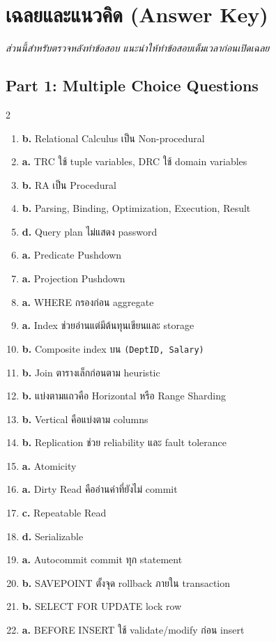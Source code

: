 \documentclass[a4paper,12pt]{article}
\newcommand{\ans}[1]{\textbf{#1}}
\begin{document}
\section*{เฉลยและแนวคิด (Answer Key)}
\textit{ส่วนนี้สำหรับตรวจหลังทำข้อสอบ แนะนำให้ทำข้อสอบเต็มเวลาก่อนเปิดเฉลย}

\subsection*{Part 1: Multiple Choice Questions}
\begin{multicols}{2}
\begin{enumerate}[label=\textbf{\arabic*.}]
    \item \ans{b.} Relational Calculus เป็น Non-procedural
    \item \ans{a.} TRC ใช้ tuple variables, DRC ใช้ domain variables
    \item \ans{b.} RA เป็น Procedural
    \item \ans{b.} Parsing, Binding, Optimization, Execution, Result
    \item \ans{d.} Query plan ไม่แสดง password
    \item \ans{a.} Predicate Pushdown
    \item \ans{a.} Projection Pushdown
    \item \ans{a.} WHERE กรองก่อน aggregate
    \item \ans{a.} Index ช่วยอ่านแต่มีต้นทุนเขียนและ storage
    \item \ans{b.} Composite index บน \texttt{(DeptID, Salary)}
    \item \ans{b.} Join ตารางเล็กก่อนตาม heuristic
    \item \ans{b.} แบ่งตามแถวคือ Horizontal หรือ Range Sharding
    \item \ans{b.} Vertical คือแบ่งตาม columns
    \item \ans{b.} Replication ช่วย reliability และ fault tolerance
    \item \ans{a.} Atomicity
    \item \ans{a.} Dirty Read คืออ่านค่าที่ยังไม่ commit
    \item \ans{c.} Repeatable Read
    \item \ans{d.} Serializable
    \item \ans{a.} Autocommit commit ทุก statement
    \item \ans{b.} SAVEPOINT ตั้งจุด rollback ภายใน transaction
    \item \ans{b.} SELECT FOR UPDATE lock row
    \item \ans{a.} BEFORE INSERT ใช้ validate/modify ก่อน insert

\end{enumerate}
\end{multicols}
\end{document}

